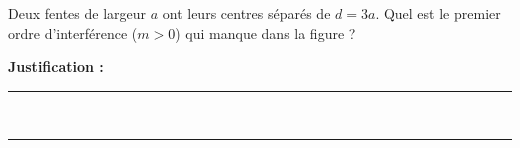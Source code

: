 Deux fentes de largeur $a$ ont leurs centres séparés de $d = 3a$. Quel est le premier ordre d'interférence ($m > 0$) qui manque dans la figure ?

\choices

\noindent\textbf{Justification :} \hrulefill \\[2.5ex]
\rule{\linewidth}{0.4pt} \\[2.5ex]
\rule{\linewidth}{0.4pt}
\vfill
